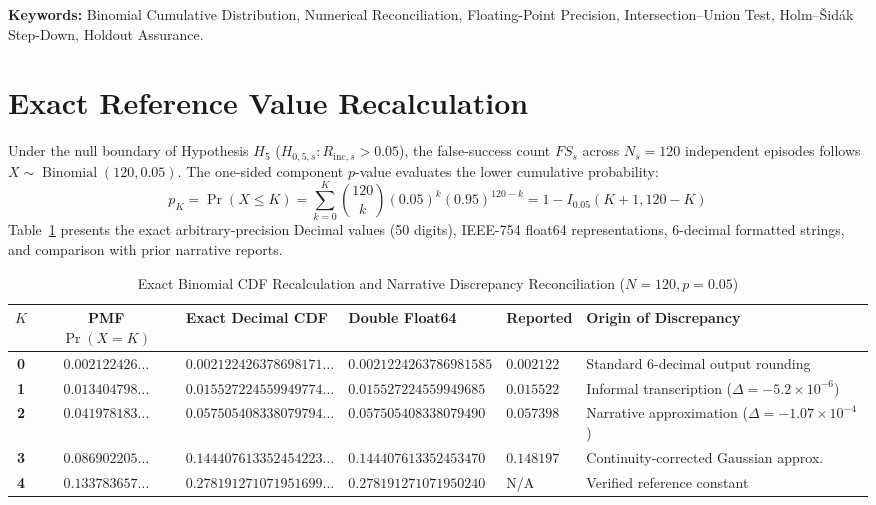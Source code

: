 \documentclass[10pt,a4paper]{article}
\begin{document}
\vspace{6pt}
\noindent \textbf{Keywords:} Binomial Cumulative Distribution, Numerical Reconciliation, Floating-Point Precision, Intersection--Union Test, Holm--Šidák Step-Down, Holdout Assurance.

\section{Exact Reference Value Recalculation}

Under the null boundary of Hypothesis $H_5$ ($H_{0,5,s}: R_{\mathrm{inc}, s} > 0.05$), the false-success count $FS_s$ across $N_s = 120$ independent episodes follows $X \sim \operatorname{Binomial}(120, 0.05)$. The one-sided component $p$-value evaluates the lower cumulative probability:
\begin{equation}
p_K = \Pr(X \le K) = \sum_{k=0}^K \binom{120}{k} (0.05)^k (0.95)^{120 - k} = 1 - I_{0.05}(K + 1, 120 - K)
\end{equation}
Table~\ref{tab:numerical_reconciliation} presents the exact arbitrary-precision Decimal values (50 digits), IEEE-754 float64 representations, 6-decimal formatted strings, and comparison with prior narrative reports.

\begin{table}[htbp]
\centering
\small
\caption{Exact Binomial CDF Recalculation and Narrative Discrepancy Reconciliation ($N=120, p=0.05$)}
\label{tab:numerical_reconciliation}
\begin{tabularx}{\textwidth}{cclllX}
\toprule
\textbf{$K$} & \textbf{PMF $\Pr(X=K)$} & \textbf{Exact Decimal CDF} & \textbf{Double Float64} & \textbf{Reported} & \textbf{Origin of Discrepancy} \\
\midrule
\textbf{0} & $0.002122426\dots$ & $0.002122426378698171\dots$ & $0.0021224263786981585$ & $0.002122$ & Standard 6-decimal output rounding \\
\textbf{1} & $0.013404798\dots$ & $0.015527224559949774\dots$ & $0.015527224559949685$ & $0.015522$ & Informal transcription ($\Delta = -5.2 \times 10^{-6}$) \\
\textbf{2} & $0.041978183\dots$ & $0.057505408338079794\dots$ & $0.057505408338079490$ & $0.057398$ & Narrative approximation ($\Delta = -1.07 \times 10^{-4}$) \\
\textbf{3} & $0.086902205\dots$ & $0.144407613352454223\dots$ & $0.144407613352453470$ & $0.148197$ & Continuity-corrected Gaussian approx. \\
\textbf{4} & $0.133783657\dots$ & $0.278191271071951699\dots$ & $0.278191271071950240$ & N/A & Verified reference constant \\
\bottomrule
\end{tabularx}
\end{table}
\end{document}
